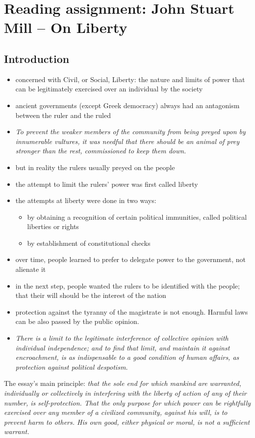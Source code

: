 \section{Reading assignment: John Stuart Mill -- On Liberty}

\subsection{Introduction}

\begin{itemize}
	\item concerned with Civil, or Social, Liberty: the nature and limits
	of power that can be legitimately exercised over an individual by the
	society
	\item ancient governments (except Greek democracy) always had an
	antagonism between the ruler and the ruled
	\item \textit{To prevent the weaker members of the community
	from being preyed upon by innumerable vultures, it
	was needful that there should be an animal of prey
	stronger than the rest, commissioned to keep them
	down.}
	\item but in reality the rulers usually preyed on the people
	\item the attempt to limit the rulers' power was first called liberty
	\item the attempts at liberty were done in two ways:
	\begin{itemize}
		\item by obtaining a recognition of certain political
		immunities, called political liberties or rights
		\item by establishment of constitutional checks
	\end{itemize}
	\item over time, people learned to prefer to delegate power to the
	government, not alienate it
	\item in the next step, people wanted the rulers to be identified with
	the people; that their will should be the interest of the nation
	\item protection against the tyranny of the magistrate is not enough.
	Harmful laws can be also passed by the public opinion.
	\item \textit{There is a limit to the legitimate
	interference of collective opinion with individual independence; and
	to find that limit, and maintain it against encroachment, is as
	indispensable to a good condition of human affairs, as protection
	against political despotism.}
\end{itemize}

The essay's main principle: \textit{that the sole end for which mankind are
warranted, individually or collectively in interfering with the liberty of
action of any of their number, is self-protection. That the only purpose for
which power can be rightfully exercised over any member of a civilized
community, against his will, is to prevent harm to others. His own good,
either physical or moral, is not a sufficient warrant.}

